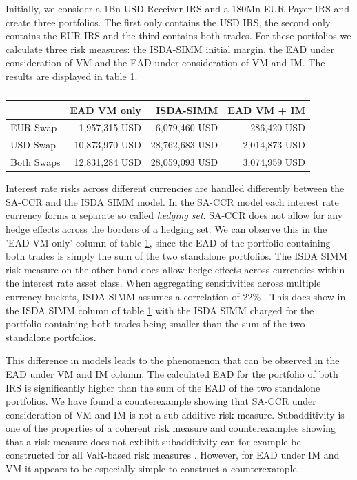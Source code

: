 \documentclass[../Thesis_AHoecherl.tex]{subfiles}
\begin{document}
    Initially, we consider a 1Bn USD Receiver IRS and a 180Mn EUR Payer IRS and create three portfolios. The first only contains the USD IRS, the second only contains the EUR IRS and the third contains both trades.
    For these portfolios we calculate three risk measures: the ISDA-SIMM initial margin, the EAD under consideration of VM and the EAD under consideration of VM and IM. The results are displayed in table \ref{tab:2TradeRatesResults}.

    \begin{table}[htbp]
        \centering
        \begin{tabular}{l||r|r|r}
                & EAD VM only &ISDA-SIMM & EAD VM + IM \\
                \toprule
        EUR Swap & 1,957,315 USD & 6,079,460 USD & 286,420 USD \\
        USD Swap & 10,873,970 USD & 28,762,683 USD & 2,014,873 USD \\
        Both Swaps & 12,831,284 USD & 28,059,093 USD & 3,074,959 USD \\
        \end{tabular}%
        \caption{}
        \label{tab:2TradeRatesResults}%
    \end{table}%

    Interest rate risks across different currencies are handled differently between the SA-CCR and the ISDA SIMM model.
    In the SA-CCR model each interest rate currency forms a separate so called \emph{hedging set}. SA-CCR does not allow for any hedge effects across the borders of a hedging set.
    We can observe this in the 'EAD VM only' column of table \ref{tab:2TradeRatesResults}, since the EAD of the portfolio containing both trades is simply the sum of the two standalone portfolios.
    The ISDA SIMM risk measure on the other hand does allow hedge effects across currencies within the interest rate asset class. When aggregating sensitivities across multiple currency buckets, ISDA SIMM assumes a correlation of 22\% \cite[Section D.2]{SIMM}.
    This does show in the ISDA SIMM column of table \ref{tab:2TradeRatesResults} with the ISDA SIMM charged for the portfolio containing both trades being smaller than the sum of the two standalone portfolios.
    
    This difference in models leads to the phenomenon that can be observed in the EAD under VM and IM column. The calculated EAD for the portfolio of both IRS is significantly higher than the sum of the EAD of the two standalone portfolios.
    We have found a counterexample showing that SA-CCR under consideration of VM and IM is not a sub-additive risk measure.
    Subadditivity is one of the properties of a coherent risk measure  and counterexamples showing that a risk measure does not exhibit subadditivity can for example be constructed for all VaR-based risk measures . However, for EAD under IM and VM it appears to be especially simple to construct a counterexample.
\end{document}
